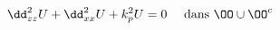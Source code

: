 \begin{equation}
\dd_{\z\z}^2 U + \dd_{\x\x}^2 U + k_p^2 U = 0 \quad \text { dans \(\OO\cup\OO^c\)}
\end{equation}


% 
% 
% 





